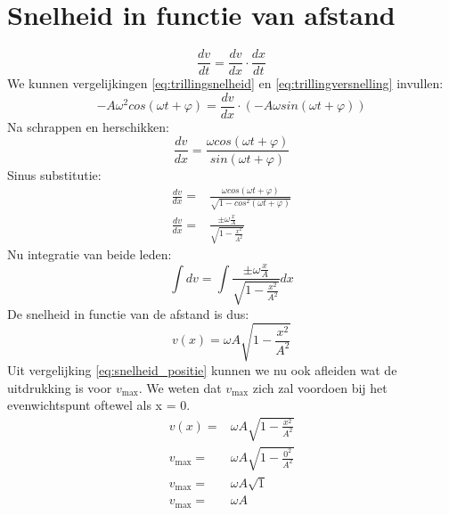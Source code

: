\documentclass[a4paper,kul]{kulakarticle} %
\begin{document}
\section{Snelheid in functie van afstand}
\begin{equation*}
	\frac{dv}{dt} = \frac{dv}{dx}\cdot\frac{dx}{dt}
\end{equation*}
We kunnen vergelijkingen \ref{eq:trillingsnelheid} en \ref{eq:trillingversnelling} invullen:
\begin{equation*}
	-A\omega^2cos(\omega t + \varphi) = \frac{dv}{dx}\cdot (-A\omega sin(\omega t +\varphi))
\end{equation*}
Na schrappen en herschikken:
\begin{equation*}
	\frac{dv}{dx} = \frac{\omega cos(\omega t + \varphi)}{sin(\omega t + \varphi)}
\end{equation*}
Sinus substitutie:
\begin{align*}
	\frac{dv}{dx} =& \frac{\omega cos(\omega t + \varphi)}{\sqrt{1-cos^2(\omega t + \varphi)}}\\
	\frac{dv}{dx} =& \frac{\pm \omega \frac{x}{A}}{\sqrt{1-\frac{x^2}{A^2}}}
\end{align*}
Nu integratie van beide leden:
\begin{equation*}
	\int dv = \int \frac{\pm \omega \frac{x}{A}}{\sqrt{1-\frac{x^2}{A^2}}} dx
\end{equation*}
De snelheid in functie van de afstand is dus:
\begin{equation}
	\label{eq:snelheid_positie}
	v(x) = \omega A\sqrt{1-\frac{x^2}{A^2}}
\end{equation}
Uit vergelijking \ref{eq:snelheid_positie} kunnen we nu ook afleiden wat de uitdrukking is voor $v_{\text{max}}$. We weten dat $v_{\text{max}}$ zich zal voordoen bij het evenwichtspunt oftewel als x = 0.
\begin{align*}
	v(x) =& \omega A\sqrt{1-\frac{x^2}{A^2}}\\
	v_{\text{max}} =& \omega A\sqrt{1-\frac{0^2}{A^2}}\\
	v_{\text{max}} =& \omega A\sqrt{1}\\
	v_{\text{max}} =& \omega A
\end{align*}
\newpage
\end{document}
